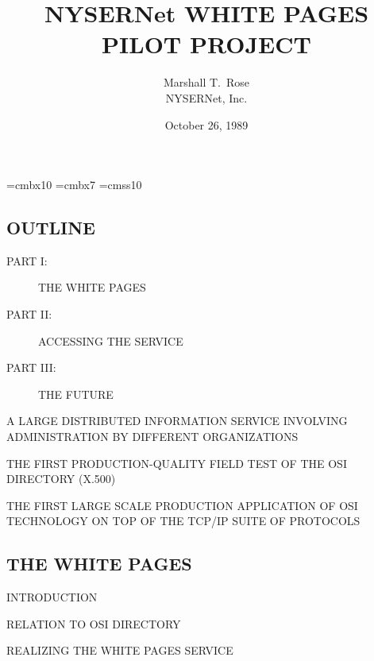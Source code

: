 

\def\emph#1{\underline{#1}}

\font\xx=cmbx10
\font\yy=cmbx7
\font\sf=cmss10

\raggedright


\let\tradeNAMfont=\relax
\let\tradeORGfont=\relax



\title	{NYSERNet WHITE PAGES\\ PILOT PROJECT}
\author	{Marshall T.~Rose\\ NYSERNet, Inc.}
\date	{October 26, 1989}
\maketitlepage


\begin{bwslide}
\part*	{OUTLINE}\bf

\begin{description}
\item[PART I:]		THE WHITE PAGES

\item[PART II:]		ACCESSING THE SERVICE

\item[PART III:]	THE FUTURE
\end{description}
\end{bwslide}


\begin{bwslide}

\begin{nrtc}
\item	A LARGE DISTRIBUTED INFORMATION SERVICE INVOLVING ADMINISTRATION BY
	DIFFERENT ORGANIZATIONS

\item	THE FIRST PRODUCTION-QUALITY FIELD TEST OF THE OSI DIRECTORY (X.500)

\item	THE FIRST LARGE SCALE PRODUCTION APPLICATION OF OSI TECHNOLOGY ON TOP
	OF THE TCP/IP SUITE OF PROTOCOLS
\end{nrtc}
\end{bwslide}


\begin{bwslide}
\part	{THE WHITE PAGES}\bf

\begin{nrtc}
\item	INTRODUCTION

\item	RELATION TO OSI DIRECTORY

\item	REALIZING THE WHITE PAGES SERVICE
\end{nrtc}
\end{bwslide}


